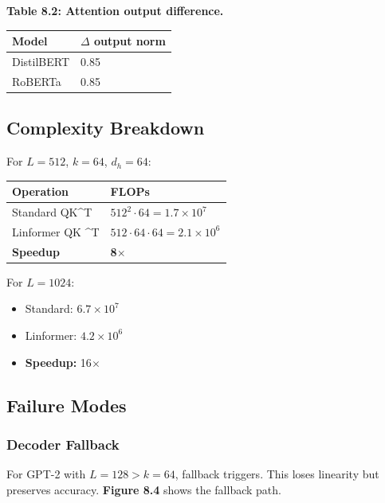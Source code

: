\textbf{Table 8.2: Attention output difference.}

\begin{table}[H]
\centering
\small
\begin{tabular}{ll}
\toprule
\textbf{Model} & \textbf{$\Delta$ output norm} \\
\midrule
DistilBERT & 0.85 \\
RoBERTa & 0.85 \\
\bottomrule
\end{tabular}
\end{table}

\subsection{Complexity Breakdown}

For $L = 512$, $k = 64$, $d_h = 64$:

\begin{table}[H]
\centering
\small
\begin{tabular}{ll}
\toprule
\textbf{Operation} & \textbf{FLOPs} \\
\midrule
Standard QK^T & $512^2 \cdot 64 = 1.7 \times 10^7$ \\
Linformer QK ^T & $512 \cdot 64 \cdot 64 = 2.1 \times 10^6$ \\
\textbf{Speedup} & \textbf{8$\times$} \\
\bottomrule
\end{tabular}
\end{table}

For $L = 1024$:
\begin{itemize}
\item Standard: $6.7 \times 10^7$
\item Linformer: $4.2 \times 10^6$
\item \textbf{Speedup:} 16$\times$

\end{itemize}
\subsection{Failure Modes}

\subsubsection{Decoder Fallback}

For GPT-2 with $L = 128 > k = 64$, fallback triggers. This loses linearity 
but preserves accuracy. \textbf{Figure 8.4} shows the fallback path.

